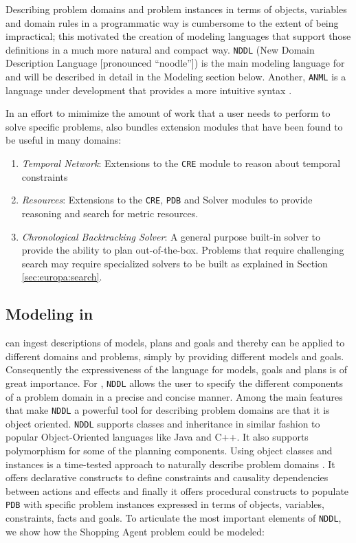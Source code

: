 Describing problem domains and problem instances in terms of objects,
variables and domain rules in a programmatic way is cumbersome to the
extent of being impractical; this motivated the creation of modeling
languages that support those definitions in a much more natural and
compact way. \texttt{NDDL} (New Domain Description Language
[pronounced ``noodle'']) \cite{NDDL} is the main modeling language for
\eu and will be described in detail in the Modeling section
below. Another, \texttt{ANML} is a language under development that
provides a more intuitive syntax \cite{smith08}.
  
In an effort to mimimize the amount of work that a user needs to
perform to solve specific problems, \eu also bundles extension
modules that have been found to be useful in many domains:

\begin{enumerate}

\item \textit{Temporal Network}: Extensions to the \texttt{CRE} module to
  reason about temporal constraints

\item \textit{Resources}: Extensions to the \texttt{CRE}, \texttt{PDB}
  and Solver modules to provide reasoning and search for metric
  resources.

\item \textit{Chronological Backtracking Solver}: A general purpose
  built-in solver to provide the ability to plan out-of-the-box.
  Problems that require challenging search may require specialized
  solvers to be built as explained in Section \ref{sec:europa:search}.

\end{enumerate}

\subsection{Modeling in \eu}
\label{sec:europa:modeling}

\eu can ingest descriptions of models, plans and goals and thereby can
be applied to different domains and problems, simply by providing
different models and goals. Consequently the expressiveness of the
language for models, goals and plans is of great importance. For \eue,
\texttt{NDDL} allows the user to specify the different components of a
problem domain in a precise and concise manner. Among the main
features that make \texttt{NDDL} a powerful tool for describing
problem domains are that it is object oriented. \texttt{NDDL} supports
classes and inheritance in similar fashion to popular Object-Oriented
languages like Java and C++. It also supports polymorphism for some of
the planning components. Using object classes and instances is a
time-tested approach to naturally describe problem domains
\cite{rumbaugh}. It offers declarative constructs to define
constraints and causality dependencies between actions and effects and
finally it offers procedural constructs to populate \eus \texttt{PDB}
with specific problem instances expressed in terms of objects,
variables, constraints, facts and goals. To articulate the most important
elements of \texttt{NDDL}, we show how the Shopping Agent problem
could be modeled:

